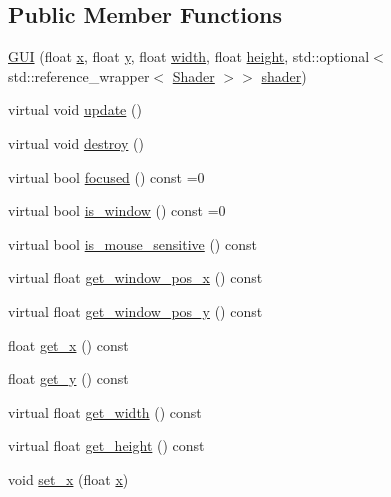 \subsection*{Public Member Functions}
\begin{DoxyCompactItemize}
\item 
\mbox{\hyperlink{class_g_u_i_a7af10a4c97e3e2c7f59134458ce36d6f}{G\+UI}} (float \mbox{\hyperlink{class_g_u_i_a7fa193a8ffb27bbb3bcc225e36f6d54d}{x}}, float \mbox{\hyperlink{class_g_u_i_a98f204f99ffc5ff6cffc9340bbb8c29b}{y}}, float \mbox{\hyperlink{class_g_u_i_aee5d8766834f6f743f0d8b8c16e47155}{width}}, float \mbox{\hyperlink{class_g_u_i_a70b578c36323a45cac88ccff3bced933}{height}}, std\+::optional$<$ std\+::reference\+\_\+wrapper$<$ \mbox{\hyperlink{class_shader}{Shader}} $>$$>$ \mbox{\hyperlink{class_g_u_i_a64b007b31d0ec8a8704f9ab3bb2a7d3d}{shader}})
\item 
virtual void \mbox{\hyperlink{class_g_u_i_a947e568bf884a8798e3e368417f662c7}{update}} ()
\item 
virtual void \mbox{\hyperlink{class_g_u_i_a2abe7f08a1da35af8ae006fbecea94e0}{destroy}} ()
\item 
virtual bool \mbox{\hyperlink{class_g_u_i_ad2a7c1ae3938ba1d6dea0142f16d6c2b}{focused}} () const =0
\item 
virtual bool \mbox{\hyperlink{class_g_u_i_a7ef5287aaa630a8d1146f0d5a35b6683}{is\+\_\+window}} () const =0
\item 
virtual bool \mbox{\hyperlink{class_g_u_i_aff34edd65faff6f3e908070a2060f6b8}{is\+\_\+mouse\+\_\+sensitive}} () const
\item 
virtual float \mbox{\hyperlink{class_g_u_i_abbad56adda65a7176a4e0c7e260d9449}{get\+\_\+window\+\_\+pos\+\_\+x}} () const
\item 
virtual float \mbox{\hyperlink{class_g_u_i_a34753a0119188e4b17b4b5209c795c3a}{get\+\_\+window\+\_\+pos\+\_\+y}} () const
\item 
float \mbox{\hyperlink{class_g_u_i_a933b6bc6c5288f785d50e2621ead2193}{get\+\_\+x}} () const
\item 
float \mbox{\hyperlink{class_g_u_i_a6a33d5bbe2d6b57b7fd2d9dc141cc3ae}{get\+\_\+y}} () const
\item 
virtual float \mbox{\hyperlink{class_g_u_i_a3606efd6a6db43f9751110d41ec195a3}{get\+\_\+width}} () const
\item 
virtual float \mbox{\hyperlink{class_g_u_i_a4e427bc7271c6478d98f2215349dce07}{get\+\_\+height}} () const
\item 
void \mbox{\hyperlink{class_g_u_i_a677bae0d1184e72deaf25fac052a8f95}{set\+\_\+x}} (float \mbox{\hyperlink{class_g_u_i_a7fa193a8ffb27bbb3bcc225e36f6d54d}{x}})
$$
\end{DoxyCompactItemize}
